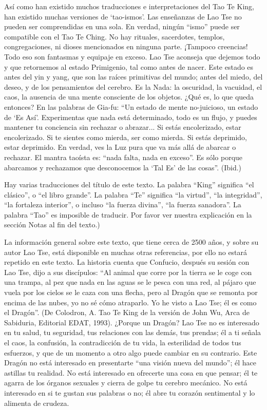 \documentclass[hidelinks]{memoir}
\begin{document}
	Así como han existido muchos traducciones e interpretaciones del Tao Te
	King, han existido muchas versiones de `tao-ismos'. Las enseñanzas de
	Lao Tse no pueden ser comprendidas en una sola. En verdad, ningún
	``ismo'' puede ser compatible con el Tao Te Ching. No hay rituales,
	sacerdotes, templos, congregaciones, ni dioses mencionados en ninguna
	parte. ¡Tampoco creencias! Todo eso son fantasmas y equipaje en exceso.
	Lao Tse aconseja que dejemos todo y que retornemos al estado Primigenio,
	tal como antes de nacer. Este estado es antes del yin y yang, que son
	las raíces primitivas del mundo; antes del miedo, del deseo, y de los
	pensamientos del cerebro. Es la Nada: la oscuridad, la vacuidad, el
	caos, la ausencia de una mente consciente de los objetos. ¿Qué es, lo
	que queda entonces? En las palabras de Gia-fu: ``Un estado de mente
	no-juicioso, un estado de `Es Así'. Experimentas que nada está
	determinado, todo es un flujo, y puedes mantener tu conciencia sin
	rechazar o abrazar... Si estás encolerizado, estar encolerizado. Si te
	sientes como mierda, ser como mierda. Si estás deprimido, estar
	deprimido. En verdad, ves la Luz pura que va más allá de abarcar o
	rechazar. El mantra taoísta es: ``nada falta, nada en exceso''. Es sólo
	porque abarcamos y rechazamos que desconocemos la `Tal Es' de las
	cosas''. (Ibid.)
	
	Hay varias traducciones del título de este texto. La palabra ``King''
	significa ``el clásico'', o ``el libro grande''. La palabra ``Te''
	significa ``la virtud'', ``la integridad'', ``la fortaleza interior'', o
	incluso ``la fuerza divina'', ``la fuerza sanadora''. La palabra ``Tao''
	es imposible de traducir. Por favor ver nuestra explicación en la
	sección Notas al fin del texto.)
	
	La información general sobre este texto, que tiene cerca de 2500 años, y
	sobre su autor Lao Tse, está disponible en muchas otras referencias, por
	ello no estará repetido en este texto. La historia cuenta que Confucio,
	después su sesión con Lao Tse, dijo a sus discípulos: ``Al animal que
	corre por la tierra se le coge con una trampa, al pez que nada en las
	aguas se le pesca con una red, al pájaro que vuela por los cielos se le
	caza con una flecha, pero al Dragón que se remonta por encima de las
	nubes, yo no sé cómo atraparlo. Yo he visto a Lao Tse; él es como el
	Dragón''. (De Colodron, A. Tao Te King de la versión de John Wu, Arca de
	Sabiduria, Editorial EDAT, 1993). ¿Porque un Dragón? Lao Tse no es
	interesado en tu salud, tu seguridad, tus relaciones con las demás, tus
	prendas; él a ti señala el caos, la confusión, la contradicción de tu
	vida, la esterilidad de todos tus esfuerzos, y que de un momento a otro
	algo puede cambiar en su contrario. Este Dragón no está interesado en
	presentarte ``una visión nueva del mundo''; él hace astillas tu
	realidad. No está interesado en ofrecerte una cosa en que pensar; él te
	agarra de los órganos sexuales y cierra de golpe tu cerebro mecánico. No
	está interesado en si te gustan sus palabras o no; él abre tu corazón
	sentimental y lo alimenta de crudeza.
	
\end{document}
